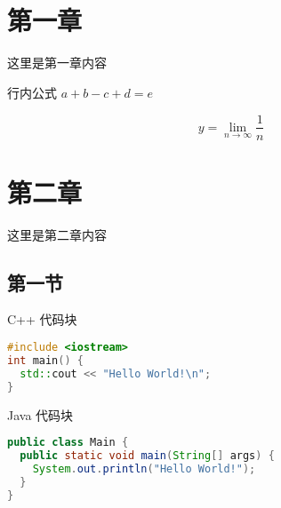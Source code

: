 \documentclass[a4paper]{article}
\begin{document}
\renewcommand{\contentsname}{目\ 录}
\renewcommand{\appendixname}{附录}
\renewcommand{\appendixpagename}{附录}
\renewcommand{\refname}{参考文献} 
\renewcommand{\figurename}{图}
\renewcommand{\tablename}{表}
\renewcommand{\today}{\number\year 年 \number\month 月 \number\day 日}

\begin{titlepage}
\begin{center}
  \vspace*{36pt}
   \\
  \vspace*{24pt}
   \\
  \vspace*{380pt}
\end{center}
\date{\today}
\author{wjl}
\end{titlepage}
\newpage

\tableofcontents

\newpage

\section{第一章}\label{sec1}

这里是第一章内容

行内公式 $a + b - c + d = e$

\[
y = \lim_{n \to \infty} \frac{1}{n}  
\]

\section{第二章}\label{sec2}

这里是第二章内容

\subsection{第一节}\label{sec2:sub1}

C++ 代码块

\begin{lstlisting}[language=c++]
#include <iostream>
int main() {
  std::cout << "Hello World!\n";
}
\end{lstlisting}

Java 代码块

\begin{lstlisting}[language=java]
public class Main {
  public static void main(String[] args) {
    System.out.println("Hello World!");
  }
}
\end{lstlisting}
\end{document}
